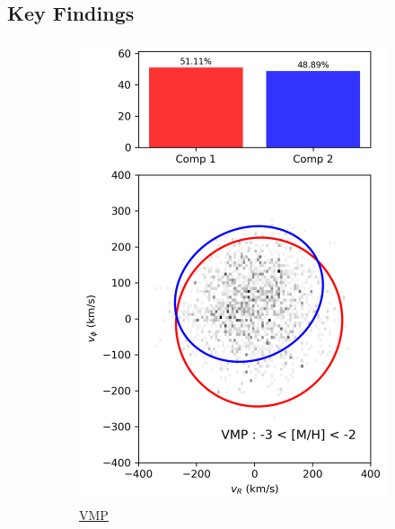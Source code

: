 \documentclass[a4paper,10pt]{article}
\begin{document}
\begin{multicols}{2}
\section*{Key Findings}

\begin{figure}[H]
  \centering
  \begin{subfigure}[t]{0.24\linewidth}
    \includegraphics[width=\linewidth]{../figures/gmm_VMP.png}
    \caption{\href{https://raw.githack.com/raunaq-rai/Disentangling-the-Milky-Way-using-GMM/main/figures/VMP\_\_-3\%5BM\_H\%5D-2.html}{VMP}}
    \label{fig:gmm_vmp}
  \end{subfigure}\hfill
  \begin{subfigure}[t]{0.24\linewidth}

\end{subfigure}
\end{figure}
\end{multicols}
\end{document}
